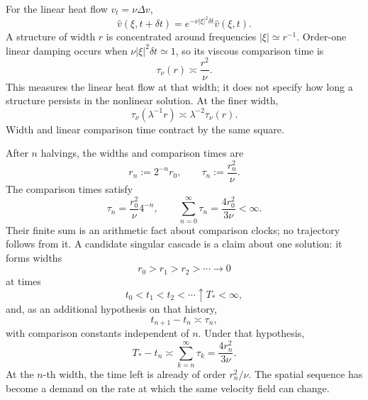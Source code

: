 
For the linear heat flow \(v_t=\nu\Delta v\),
\[
  \widehat v(\xi,t+\delta t)
  =
  e^{-\nu|\xi|^2\delta t}\widehat v(\xi,t).
\]
A structure of width \(r\) is concentrated around frequencies \(|\xi|\simeq r^{-1}\).
Order-one linear damping occurs when \(\nu|\xi|^2\delta t\simeq1\), so its viscous comparison time is
\begin{equation}\label{eq:BodyHeatComparisonTime}
  \tau_\nu(r)
  \asymp
  \frac{r^2}{\nu}.
\end{equation}
This measures the linear heat flow at that width; it does not specify how long a structure persists in the nonlinear solution.
At the finer width,
\[
  \tau_\nu(\lambda^{-1}r)
  \asymp
  \lambda^{-2}\tau_\nu(r).
\]
Width and linear comparison time contract by the same square.


After \(n\) halvings, the widths and comparison times are
\[
  r_n:=2^{-n}r_0,
  \qquad
  \tau_n:=\frac{r_n^2}{\nu}.
\]
The comparison times satisfy
\[
  \tau_n
  =
  \frac{r_0^2}{\nu}4^{-n},
  \qquad
  \sum_{n=0}^{\infty}\tau_n
  =
  \frac{4r_0^2}{3\nu}
  <
  \infty.
\]
Their finite sum is an arithmetic fact about comparison clocks; no \NavierStokes{} trajectory follows from it.
A candidate singular cascade is a claim about one solution: it forms widths
\[
  r_0>r_1>r_2>\cdots\longrightarrow0
\]
at times
\[
  t_0<t_1<t_2<\cdots\uparrow T_*<\infty,
\]
and, as an additional hypothesis on that history,
\[
  t_{n+1}-t_n\asymp\tau_n,
\]
with comparison constants independent of \(n\).
Under that hypothesis,
\[
  T_*-t_n
  \asymp
  \sum_{k=n}^{\infty}\tau_k
  =
  \frac{4r_n^2}{3\nu}.
\]
At the \(n\)-th width, the time left is already of order \(r_n^2/\nu\).
The spatial sequence has become a demand on the rate at which the same velocity field can change.
